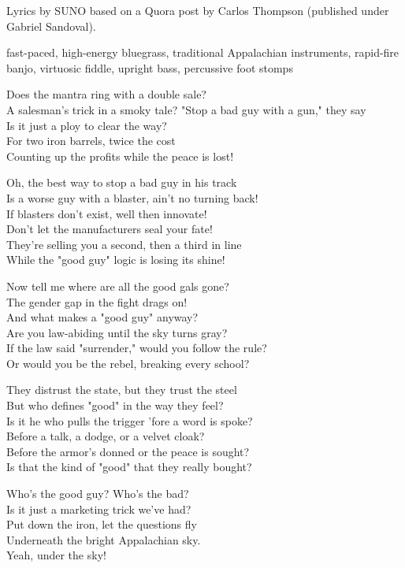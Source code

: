 
\begin{notes}
Lyrics by SUNO based on a Quora post by Carlos Thompson (published under Gabriel Sandoval).
\end{notes}
\begin{style}
fast-paced, high-energy bluegrass, traditional Appalachian instruments, rapid-fire banjo, virtuosic fiddle, upright bass, percussive foot stomps
\end{style}
\begin{lyrics}
Does the mantra ring with a double sale?\\
A salesman's trick in a smoky tale?
"Stop a bad guy with a gun," they say\\
Is it just a ploy to clear the way?\\
For two iron barrels, twice the cost\\
Counting up the profits while the peace is lost!

Oh, the best way to stop a bad guy in his track\\
Is a worse guy with a blaster, ain't no turning back!\\
If blasters don't exist, well then innovate!\\
Don't let the manufacturers seal your fate!\\
They're selling you a second, then a third in line\\
While the "good guy" logic is losing its shine!

Now tell me where are all the good gals gone?\\
The gender gap in the fight drags on!\\
And what makes a "good guy" anyway?\\
Are you law-abiding until the sky turns gray?\\
If the law said "surrender," would you follow the rule?\\
Or would you be the rebel, breaking every school?

They distrust the state, but they trust the steel\\
But who defines "good" in the way they feel?\\
Is it he who pulls the trigger 'fore a word is spoke?\\
Before a talk, a dodge, or a velvet cloak?\\
Before the armor's donned or the peace is sought?\\
Is that the kind of "good" that they really bought?

Who’s the good guy? Who’s the bad?\\
Is it just a marketing trick we've had?\\
Put down the iron, let the questions fly\\
Underneath the bright Appalachian sky.\\
Yeah, under the sky!
\end{lyrics}

